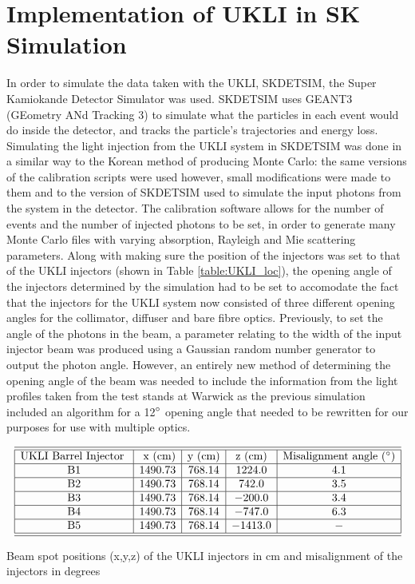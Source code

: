 \section{Implementation of UKLI in SK Simulation}
In order to simulate the data taken with the UKLI, SKDETSIM, the Super Kamiokande Detector Simulator was used. SKDETSIM uses GEANT3 (GEometry ANd Tracking 3) to simulate what the particles in each event would do inside the detector, and tracks the particle's trajectories and energy loss. Simulating the light injection from the UKLI system in SKDETSIM was done in a similar way to the Korean method of producing Monte Carlo: the same versions of the calibration scripts were used however, small modifications were made to them and to the version of SKDETSIM used to simulate the input photons from the system in the detector. The calibration software allows for the number of events and the number of injected photons to be set, in order to generate many Monte Carlo files with varying absorption, Rayleigh and Mie scattering parameters. 
\newline
Along with making sure the position of the injectors was set to that of the UKLI injectors (shown in Table \ref{table:UKLI_loc}), the opening angle of the injectors determined by the simulation had to be set to accomodate the fact that the injectors for the UKLI system now consisted of three different opening angles for the collimator, diffuser and bare fibre optics. Previously, to set the angle of the photons in the beam, a parameter relating to the width of the input injector beam was produced using a Gaussian random number generator to output the photon angle. However, an entirely new method of determining the opening angle of the beam was needed to include the information from the light profiles taken from the test stands at Warwick as the previous simulation included an algorithm for a 12$\degree$ opening angle that needed to be rewritten for our purposes for use with multiple optics. 

\begin{table}[htp]
    $$
\begin{array}{|c|c|c|c|c|c|}  
    \hline \hline{\text {UKLI Barrel Injector }} & {\text { x (cm)}} & {\text {y (cm)}} & {\text {z (cm)}} & {\text{Misalignment angle ($\degree$)}}  \tabularnewline
    \hline \text { B1 } & 1490.73 & 768.14 & 1224.0 & 4.1 \\
    \hline \text { B2 } & 1490.73 & 768.14 & 742.0 & 3.5 \\
    \hline \text { B3 } & 1490.73 & 768.14 & -200.0 & 3.4 \\
    \hline \text { B4 } & 1490.73 & 768.14 & -747.0 & 6.3 \\
    \hline \text { B5 } & 1490.73 & 768.14 &  -1413.0 & - \\
    \hline \hline 
\end{array}
    $$
\caption{Beam spot positions (x,y,z) of the UKLI injectors in cm and misalignment of the injectors in degrees} 
\label{table:UKLI_loc}
\end{table}

